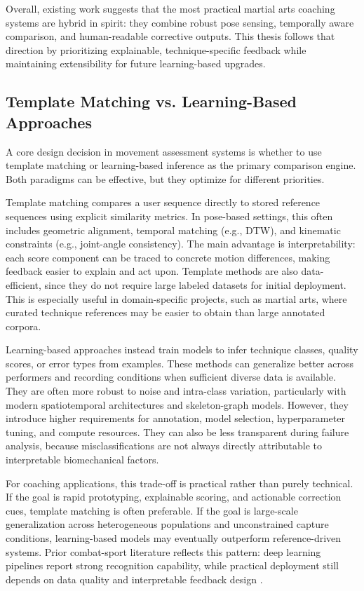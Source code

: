 \documentclass[12pt]{article}
\begin{document}
{Overall, existing work suggests that the most practical martial arts coaching systems are hybrid in spirit: they combine robust pose sensing, temporally aware comparison, and human-readable corrective outputs. This thesis follows that direction by prioritizing explainable, technique-specific feedback while maintaining extensibility for future learning-based upgrades.

\subsection{Template Matching vs. Learning-Based Approaches}
A core design decision in movement assessment systems is whether to use template matching or learning-based inference as the primary comparison engine. Both paradigms can be effective, but they optimize for different priorities.

Template matching compares a user sequence directly to stored reference sequences using explicit similarity metrics. In pose-based settings, this often includes geometric alignment, temporal matching (e.g., DTW), and kinematic constraints (e.g., joint-angle consistency). The main advantage is interpretability: each score component can be traced to concrete motion differences, making feedback easier to explain and act upon. Template methods are also data-efficient, since they do not require large labeled datasets for initial deployment. This is especially useful in domain-specific projects, such as martial arts, where curated technique references may be easier to obtain than large annotated corpora.

Learning-based approaches instead train models to infer technique classes, quality scores, or error types from examples. These methods can generalize better across performers and recording conditions when sufficient diverse data is available. They are often more robust to noise and intra-class variation, particularly with modern spatiotemporal architectures and skeleton-graph models. However, they introduce higher requirements for annotation, model selection, hyperparameter tuning, and compute resources. They can also be less transparent during failure analysis, because misclassifications are not always directly attributable to interpretable biomechanical factors.

For coaching applications, this trade-off is practical rather than purely technical. If the goal is rapid prototyping, explainable scoring, and actionable correction cues, template matching is often preferable. If the goal is large-scale generalization across heterogeneous populations and unconstrained capture conditions, learning-based models may eventually outperform reference-driven systems. Prior combat-sport literature reflects this pattern: deep learning pipelines report strong recognition capability, while practical deployment still depends on data quality and interpretable feedback design \cite{martialartsDL2023,journalEQ2025}.

}
\end{document}
